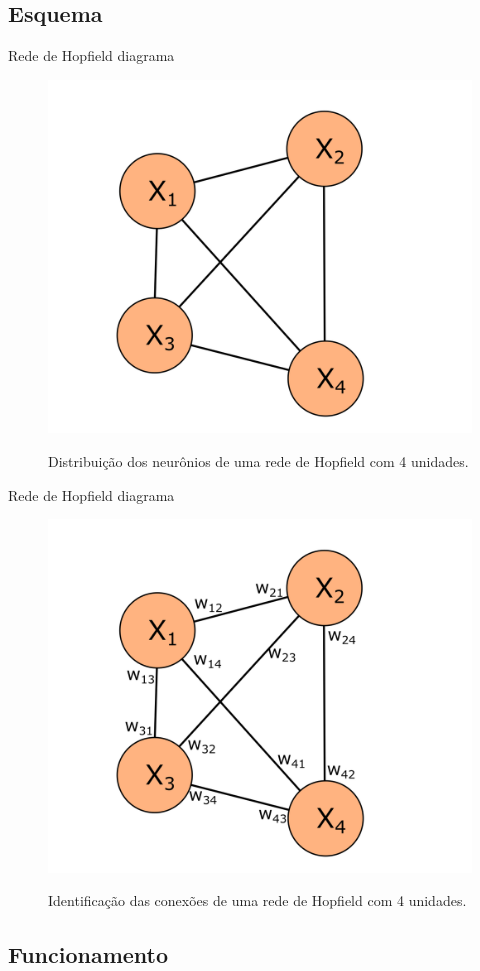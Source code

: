 \subsection{Esquema}
\begin{frame}{Rede de Hopfield diagrama}
  \begin{figure}[h]{}%
    \label{fig:hopfield}%
    \includegraphics[scale=0.5]{images/hopfield.png}
    \caption{Distribuição dos neurônios de uma rede de Hopfield com 4 unidades.}
  \end{figure}
\end{frame}

\begin{frame}{Rede de Hopfield diagrama}
  \begin{figure}[h]{}%
    \label{fig:hopfield-full}%
    \includegraphics[scale=0.5]{images/hopfield_full.png}
    \caption{Identificação das conexões de uma rede de Hopfield com 4 unidades.}
  \end{figure}
\end{frame}

\subsection{Funcionamento}
\begin{frame}{}
\end{frame}
